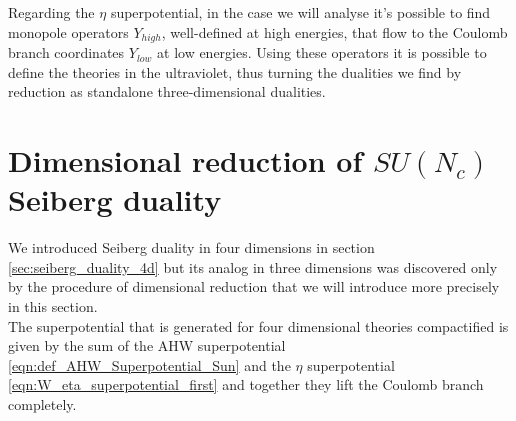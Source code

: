 Regarding the $\eta$ superpotential, in the case we will analyse it's possible to find monopole operators $Y_{high}$, well-defined at high energies, that flow to the Coulomb branch coordinates $Y_{low}$ at low energies. 
Using these operators it is possible to define the theories in the ultraviolet, thus turning the dualities we find by reduction as standalone three-dimensional dualities.


\section{Dimensional reduction of $SU(N_c)$ Seiberg duality}
We introduced Seiberg duality in four dimensions in section \ref{sec:seiberg_duality_4d} but its analog in three dimensions was discovered only by the procedure of dimensional reduction that we will introduce more precisely in this section.\\
The superpotential that is generated for four dimensional theories compactified is given by the sum of the AHW superpotential \eqref{eqn:def_AHW_Superpotential_Sun} and the $\eta$ superpotential \eqref{eqn:W_eta_superpotential_first} and together they lift the Coulomb branch completely.

